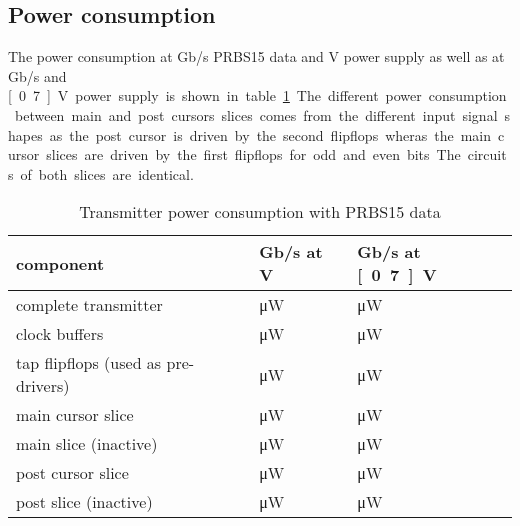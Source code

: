 \subsection{Power consumption}

The power consumption at \unit[10]{Gb/s} PRBS15 data and \unit[1]{V} power supply as well as at \unit[2]{Gb/s} and \unit[0.7]{V} power supply is shown in table \ref{tab:power_consumption_tx}. The different power consumption between main and post cursors slices comes from the different input signal shapes as the post cursor is driven by the second flipflops wheras the main cursor slices are driven by the first flipflops for odd and even bits. The circuits of both slices are identical.

\begin{table}[H]
  \centering %
  \begin{tabular}{l|l|l}
    component & \unit[10]{Gb/s} at \unit[1]{V} & \unit[2]{Gb/s} at \unit[0.7]{V}\\
    \hline
    complete transmitter &  \unit[]{\uW} & \unit[5720]{\uW}\\
    clock buffers & \unit[]{\uW} &  \unit[2221]{\uW}\\
    tap flipflops (used as pre-drivers) & \unit[3610]{\uW} &  \unit[390]{\uW}\\
    main cursor slice &  \unit[1239]{\uW} &  \unit[377]{\uW}\\
    main slice (inactive) &  \unit[1,548]{\uW} &  \unit[0,4]{\uW}\\
    post cursor slice &  \unit[1189]{\uW} &  \unit[423]{\uW}\\
    post slice (inactive) &  \unit[1,802]{\uW} &  \unit[0,4]{\uW}\\      
  \end{tabular}
  \caption{Transmitter power consumption with PRBS15 data}
  \label{tab:power_consumption_tx}
\end{table}
